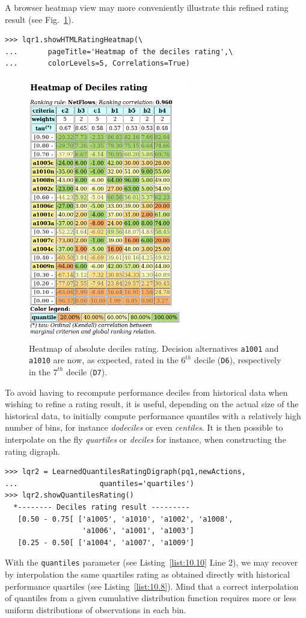 A browser heatmap view may more conveniently illustrate this refined rating result (see Fig.~\ref{fig:10.4}).
\begin{lstlisting}
>>> lqr1.showHTMLRatingHeatmap(\
...       pageTitle='Heatmap of the deciles rating',\
...       colorLevels=5, Correlations=True)
\end{lstlisting}
\begin{figure}[h]
\sidecaption[t]
\includegraphics[width=7cm]{Figures/heatMap2.png}
\caption{Heatmap of absolute deciles rating. Decision alternatives \texttt{a1001} and \texttt{a1010} are now, as expected, rated in the $6^{th}$ decile (\texttt{D6}), respectively in the $7^{th}$ decile (\texttt{D7}).}
\label{fig:10.4}       %
\end{figure}

To avoid having to recompute performance deciles from historical data when wishing to refine a rating result, it is useful, depending on the actual size of the historical data, to initially compute performance quantiles with a relatively high number of bins, for instance \emph{dodeciles} or even \emph{centiles}. It is then possible to interpolate on the fly \emph{quartiles} or \emph{deciles} for instance, when constructing the rating digraph. 
\begin{lstlisting}[caption={From deciles interpolated quartiles rating result},label=list:10.10]
>>> lqr2 = LearnedQuantilesRatingDigraph(pq1,newActions,
...                   quantiles='quartiles')
>>> lqr2.showQuantilesRating()
  *-------- Deciles rating result ---------
   [0.50 - 0.75[ ['a1005', 'a1010', 'a1002', 'a1008',
                  'a1006', 'a1001', 'a1003']
   [0.25 - 0.50[ ['a1004', 'a1007', 'a1009']
\end{lstlisting}
With the \texttt{quantiles} parameter (see Listing~\ref{list:10.10} Line 2), we may recover by interpolation the same quartiles rating as obtained directly with historical performance quartiles (see Listing~\ref{list:10.8}). Mind that a correct interpolation of quantiles from a given cumulative distribution function requires more or less uniform distributions of observations in each bin. 

